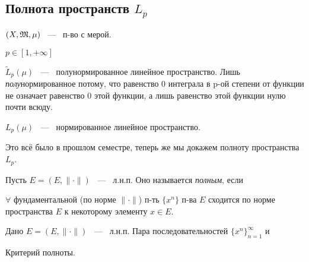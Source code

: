 \subsection{Полнота пространств $L_p$}

\noindent

$(X, \mathfrak{M}, \mu)$ ~---~ п-во с мерой.

$p \in [1, +\infty]$

$\widetilde L_p (\mu)$  ~---~ полунормированное линейное пространство. Лишь \textit{полу}нормированное потому, что равенство 0 интеграла в p-ой степени от функции не означает равенство 0 этой функции, а лишь равенство этой функции нулю почти всюду.

$L_p (\mu)$ ~---~ нормированное линейное пространство.

Это всё было в прошлом семестре, теперь же мы докажем полноту пространства $L_p$.

\begin{definition}
	Пусть $E = (E, \|\cdot\|)$  ~---~ л.н.п. Оно называется \textit{полным}, если
	
	$\forall$ фундаментальной (по норме $\|\cdot\|$) п-ть $\{x^n\}$ п-ва $E$ сходится по норме пространства $E$ к некоторому элементу $x \in E$.
\end{definition}

\begin{definition}
	Дано $E = (E, \|\cdot\|)$  ~---~ л.н.п. Пара последовательностей $\{x^n\}_{n=1}^{\infty}$ и 
\end{definition}

\begin{theorem}
	Критерий полноты.
\end{theorem}


